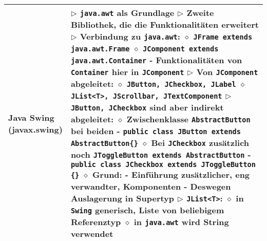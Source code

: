 \begin{longtable}{ | p{} p{} | }
	\makecell[l]{Java Swing \\ (javax.swing)} & \makecell[l]{
	$\triangleright$ \texttt{java.awt} als Grundlage \\
	$\triangleright$ Zweite Bibliothek, die die Funktionalitäten erweitert \\
	$\triangleright$ Verbindung zu \texttt{java.awt}: \\
	\hspace{0.4cm} $\diamond$ \texttt{JFrame extends java.awt.Frame} \\
	\hspace{0.4cm} $\diamond$ \texttt{JComponent extends java.awt.Container} \\
	\hspace{0.6cm} - Funktionalitäten von \texttt{Container} hier in \texttt{JComponent} \\
	$\triangleright$ Von \texttt{JComponent} abgeleitet: \\
	\hspace{0.4cm} $\diamond$ \texttt{JButton, JCheckbox, JLabel} \\
	\hspace{0.4cm} $\diamond$ \texttt{JList<T>, JScrollbar, JTextComponent} \\
	$\triangleright$ \texttt{JButton, JCheckbox} sind aber indirekt abgeleitet: \\
	\hspace{0.4cm} $\diamond$ Zwischenklasse \texttt{AbstractButton} bei beiden \\
	\hspace{0.6cm} - \texttt{public class JButton extends AbstractButton\{\}} \\
	\hspace{0.4cm} $\diamond$ Bei \texttt{JCheckbox} zusätzlich noch \texttt{JToggleButton extends AbstractButton} \\
	\hspace{0.6cm} - \texttt{public class JCheckbox extends JToggleButton \{\}} \\
	\hspace{0.4cm} $\diamond$ \textbf{Grund:} \\
	\hspace{0.6cm} - Einführung zusätzlicher, eng verwandter, Komponenten \\
	\hspace{0.6cm} - Deswegen Auslagerung in Supertyp \\
	$\triangleright$ \texttt{JList<T>}: \\
	\hspace{0.4cm} $\diamond$ in \texttt{Swing} generisch, Liste von beliebigem Referenztyp \\
	\hspace{0.4cm} $\diamond$ in \texttt{java.awt} wird String verwendet} \\ \hline
	 

\end{longtable}
